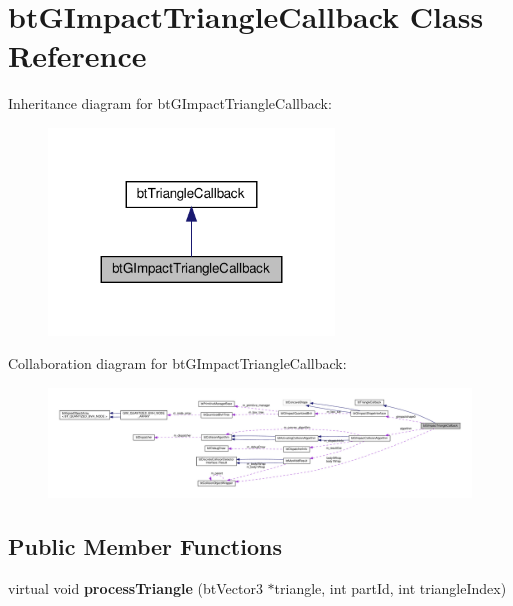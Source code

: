 \hypertarget{classbtGImpactTriangleCallback}{}\section{bt\+G\+Impact\+Triangle\+Callback Class Reference}
\label{classbtGImpactTriangleCallback}


Inheritance diagram for bt\+G\+Impact\+Triangle\+Callback\+:
\nopagebreak
\begin{figure}[H]
\begin{center}
\leavevmode
\includegraphics[width=215pt]{classbtGImpactTriangleCallback__inherit__graph}
\end{center}
\end{figure}


Collaboration diagram for bt\+G\+Impact\+Triangle\+Callback\+:
\nopagebreak
\begin{figure}[H]
\begin{center}
\leavevmode
\includegraphics[width=350pt]{classbtGImpactTriangleCallback__coll__graph}
\end{center}
\end{figure}
\subsection*{Public Member Functions}
\begin{DoxyCompactItemize}
\item 
\mbox{\label{classbtGImpactTriangleCallback_a25a0dea0d62d4567889940576624bcee}} 
virtual void {\bfseries process\+Triangle} (bt\+Vector3 $\ast$triangle, int part\+Id, int triangle\+Index)
\end{DoxyCompactItemize}
